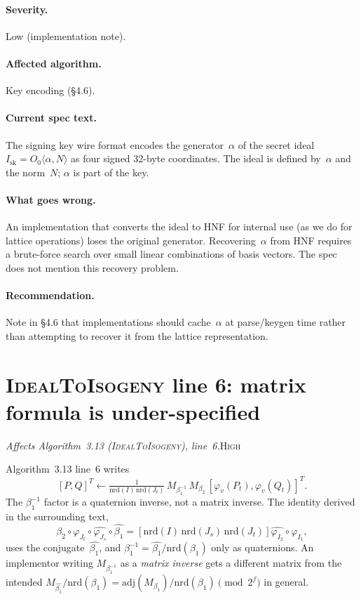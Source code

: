 \documentclass[a4paper,11pt]{article}
\newcommand{\algo}[1]{Algorithm~#1}
\newcommand{\high}{\textsc{\color{BurntOrange}High}}
\newcommand{\finding}[2]{\noindent\textit{#1}\hfill#2\par\smallskip}
\begin{document}
\paragraph{Severity.} Low (implementation note).

\paragraph{Affected algorithm.} Key encoding (\S4.6).

\paragraph{Current spec text.}
The signing key wire format encodes the generator~$\alpha$ of the
secret ideal $I_{\mathrm{sk}} = O_0\langle\alpha, N\rangle$ as four
signed 32-byte coordinates.  The ideal is defined by~$\alpha$ and
the norm~$N$; $\alpha$ is part of the key.

\paragraph{What goes wrong.}
An implementation that converts the ideal to HNF for internal use
(as we do for lattice operations) loses the original generator.
Recovering~$\alpha$ from HNF requires a brute-force search over
small linear combinations of basis vectors.  The spec does not
mention this recovery problem.

\paragraph{Recommendation.}
Note in \S4.6 that implementations should cache~$\alpha$ at
parse/keygen time rather than attempting to recover it from the
lattice representation.

\section{\textsc{IdealToIsogeny} line 6: matrix formula is under-specified}
\label{sec:id2iso-line6}

\finding{Affects \algo{3.13} (\textsc{IdealToIsogeny}), line~6.}{\high}

\algo{3.13} line~6 writes
\[
  [P, Q]^T \leftarrow \tfrac{1}{\mathrm{nrd}(I)\,\mathrm{nrd}(J_t)}\,
    M_{\beta_1^{-1}}\, M_{\beta_2}\, [\varphi_v(P_t), \varphi_v(Q_t)]^T.
\]
The $\beta_1^{-1}$ factor is a quaternion inverse, not a matrix
inverse.  The identity derived in the surrounding text,
\[
  \beta_2 \circ \varphi_{J_t} \circ \widehat{\varphi_{J_s}} \circ
    \widehat{\beta_1}
  = [\mathrm{nrd}(I)\,\mathrm{nrd}(J_s)\,\mathrm{nrd}(J_t)]
    \widehat{\varphi_{I_2}} \circ \varphi_{I_1},
\]
uses the conjugate~$\widehat{\beta_1}$, and $\beta_1^{-1} =
\widehat{\beta_1}/\mathrm{nrd}(\beta_1)$ only as quaternions.  An
implementor writing $M_{\beta_1^{-1}}$ as a \emph{matrix inverse}
gets a different matrix from the intended
$M_{\widehat{\beta_1}}/\mathrm{nrd}(\beta_1) =
\mathrm{adj}(M_{\beta_1})/\mathrm{nrd}(\beta_1) \pmod{2^f}$ in
general.
\end{document}

